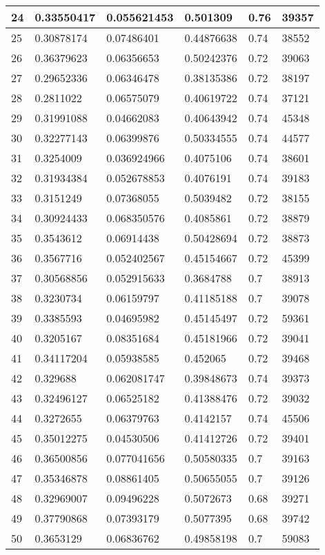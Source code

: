 \begin{longtable}{|l|l|l|l|l|l|}
24 & 0.33550417 & 0.055621453 & 0.501309 & 0.76 & 39357 \\ \hline 
25 & 0.30878174 & 0.07486401 & 0.44876638 & 0.74 & 38552 \\ \hline 
26 & 0.36379623 & 0.06356653 & 0.50242376 & 0.72 & 39063 \\ \hline 
27 & 0.29652336 & 0.06346478 & 0.38135386 & 0.72 & 38197 \\ \hline 
28 & 0.2811022 & 0.06575079 & 0.40619722 & 0.74 & 37121 \\ \hline 
29 & 0.31991088 & 0.04662083 & 0.40643942 & 0.74 & 45348 \\ \hline 
30 & 0.32277143 & 0.06399876 & 0.50334555 & 0.74 & 44577 \\ \hline 
31 & 0.3254009 & 0.036924966 & 0.4075106 & 0.74 & 38601 \\ \hline 
32 & 0.31934384 & 0.052678853 & 0.4076191 & 0.74 & 39183 \\ \hline 
33 & 0.3151249 & 0.07368055 & 0.5039482 & 0.72 & 38155 \\ \hline 
34 & 0.30924433 & 0.068350576 & 0.4085861 & 0.72 & 38879 \\ \hline 
35 & 0.3543612 & 0.06914438 & 0.50428694 & 0.72 & 38873 \\ \hline 
36 & 0.3567716 & 0.052402567 & 0.45154667 & 0.72 & 45399 \\ \hline 
37 & 0.30568856 & 0.052915633 & 0.3684788 & 0.7 & 38913 \\ \hline 
38 & 0.3230734 & 0.06159797 & 0.41185188 & 0.7 & 39078 \\ \hline 
39 & 0.3385593 & 0.04695982 & 0.45145497 & 0.72 & 59361 \\ \hline 
40 & 0.3205167 & 0.08351684 & 0.45181966 & 0.72 & 39041 \\ \hline 
41 & 0.34117204 & 0.05938585 & 0.452065 & 0.72 & 39468 \\ \hline 
42 & 0.329688 & 0.062081747 & 0.39848673 & 0.74 & 39373 \\ \hline 
43 & 0.32496127 & 0.06525182 & 0.41388476 & 0.72 & 39032 \\ \hline 
44 & 0.3272655 & 0.06379763 & 0.4142157 & 0.74 & 45506 \\ \hline 
45 & 0.35012275 & 0.04530506 & 0.41412726 & 0.72 & 39401 \\ \hline 
46 & 0.36500856 & 0.077041656 & 0.50580335 & 0.7 & 39163 \\ \hline 
47 & 0.35346878 & 0.08861405 & 0.50655055 & 0.7 & 39126 \\ \hline 
48 & 0.32969007 & 0.09496228 & 0.5072673 & 0.68 & 39271 \\ \hline 
49 & 0.37790868 & 0.07393179 & 0.5077395 & 0.68 & 39742 \\ \hline 
50 & 0.3653129 & 0.06836762 & 0.49858198 & 0.7 & 59083 \\ \hline 
\end{longtable}